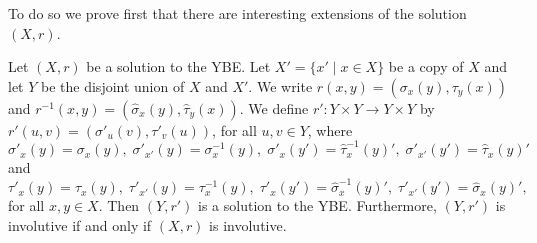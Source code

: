 To do so we prove first that there are interesting extensions of the solution $(X,r)$.

\begin{proposition}
\label{prop:extendsol}
Let $(X,r)$ be a solution to the YBE. Let $X'=\{x'\mid x\in X\}$ be a copy of $X$ and let $Y$ be the disjoint union of $X$ and $X'$. We write $r(x,y)=(\sigma_x(y),\tau_y(x))$ and $r^{-1}(x,y)=(\widehat{\sigma}_x(y),\widehat{\tau}_y(x))$. We define $r'\colon Y\times Y\rightarrow Y\times Y$ by $r'(u,v)=(\sigma'_u(v),\tau'_v(u))$, for all $u,v\in Y$, where
\[ \sigma'_x(y)=\sigma_x(y),\; \sigma'_{x'}(y)=\sigma^{-1}_x(y),\; \sigma'_{x}(y')=\widehat{\tau}^{-1}_x(y)',\; \sigma'_{x'}(y')=\widehat{\tau}_x(y)'\]
and
\[ \tau'_x(y)=\tau_x(y),\; \tau'_{x'}(y)=\tau^{-1}_x(y),\; \tau'_{x}(y')=\widehat{\sigma}^{-1}_x(y)',\; \tau'_{x'}(y')=\widehat{\sigma}_x(y)',\]
for all $x,y\in X$. Then $(Y,r')$ is a solution to the YBE. Furthermore, $(Y,r')$ is involutive if and only if $(X,r)$ is involutive.
\end{proposition}

